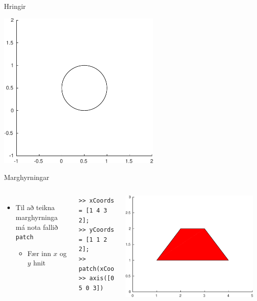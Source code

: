 \documentclass[handout]{beamer}
\begin{document}
\begin{frame}{Hringir}
\begin{center}
\includegraphics[width=0.6\textwidth]{Pics/circle-example}
\end{center}
\end{frame}

\begin{frame}[fragile]{Marghyrningar}
\begin{columns}
\begin{itemize}
 \item Til að teikna marghyrninga má nota fallið \texttt{patch}
 \begin{itemize}
  \item Fær inn $x$ og $y$ hnit
 \end{itemize}
\end{itemize}
\begin{verbatim}
>> xCoords = [1 4 3 2];
>> yCoords = [1 1 2 2];
>> patch(xCoords,yCoords,'r')
>> axis([0 5 0 3])
\end{verbatim}
\includegraphics[width=\textwidth]{Pics/patch-example}
\end{columns}
\end{frame}
\end{document}
